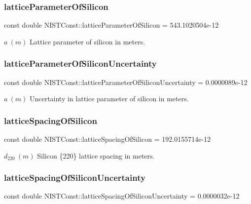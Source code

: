 \subsubsection{\texorpdfstring{lattice\+Parameter\+Of\+Silicon}{latticeParameterOfSilicon}}
{\footnotesize\ttfamily const double N\+I\+S\+T\+Const\+::lattice\+Parameter\+Of\+Silicon = 543.\+1020504e-\/12}

$a \ (m)$ Lattice parameter of silicon in meters. \mbox{\label{group___n_i_s_t_const-_silicon_ga4ced8c2e5ea89443bad8360b0a822660}} 
\subsubsection{\texorpdfstring{lattice\+Parameter\+Of\+Silicon\+Uncertainty}{latticeParameterOfSiliconUncertainty}}
{\footnotesize\ttfamily const double N\+I\+S\+T\+Const\+::lattice\+Parameter\+Of\+Silicon\+Uncertainty = 0.\+0000089e-\/12}

$a \ (m)$ Uncertainty in lattice parameter of silicon in meters. \mbox{\label{group___n_i_s_t_const-_silicon_ga439c53134da8a910d17c996b136da7a8}} 
\subsubsection{\texorpdfstring{lattice\+Spacing\+Of\+Silicon}{latticeSpacingOfSilicon}}
{\footnotesize\ttfamily const double N\+I\+S\+T\+Const\+::lattice\+Spacing\+Of\+Silicon = 192.\+0155714e-\/12}

$d_{220} \ (m)$ Silicon \{220\} lattice spacing in meters. \mbox{\label{group___n_i_s_t_const-_silicon_ga0f426756bd67207acf22b7ebc224abec}} 
\subsubsection{\texorpdfstring{lattice\+Spacing\+Of\+Silicon\+Uncertainty}{latticeSpacingOfSiliconUncertainty}}
{\footnotesize\ttfamily const double N\+I\+S\+T\+Const\+::lattice\+Spacing\+Of\+Silicon\+Uncertainty = 0.\+0000032e-\/12}

